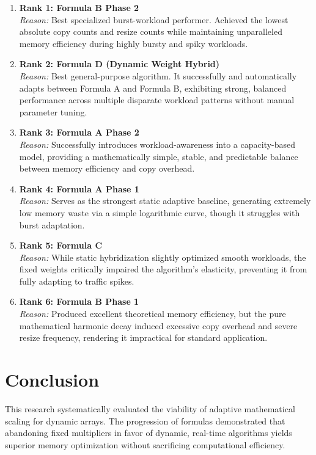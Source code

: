 \documentclass{article}
\begin{document}
\begin{enumerate}
    \item \textbf{Rank 1: Formula B Phase 2}\\
    \textit{Reason:} Best specialized burst-workload performer. Achieved the lowest absolute copy counts and resize counts while maintaining unparalleled memory efficiency during highly bursty and spiky workloads.
    
    \item \textbf{Rank 2: Formula D (Dynamic Weight Hybrid)}\\
    \textit{Reason:} Best general-purpose algorithm. It successfully and automatically adapts between Formula A and Formula B, exhibiting strong, balanced performance across multiple disparate workload patterns without manual parameter tuning.
    
    \item \textbf{Rank 3: Formula A Phase 2}\\
    \textit{Reason:} Successfully introduces workload-awareness into a capacity-based model, providing a mathematically simple, stable, and predictable balance between memory efficiency and copy overhead.
    
    \item \textbf{Rank 4: Formula A Phase 1}\\
    \textit{Reason:} Serves as the strongest static adaptive baseline, generating extremely low memory waste via a simple logarithmic curve, though it struggles with burst adaptation.
    
    \item \textbf{Rank 5: Formula C}\\
    \textit{Reason:} While static hybridization slightly optimized smooth workloads, the fixed weights critically impaired the algorithm's elasticity, preventing it from fully adapting to traffic spikes.
    
    \item \textbf{Rank 6: Formula B Phase 1}\\
    \textit{Reason:} Produced excellent theoretical memory efficiency, but the pure mathematical harmonic decay induced excessive copy overhead and severe resize frequency, rendering it impractical for standard application.
\end{enumerate}

\section{Conclusion}
This research systematically evaluated the viability of adaptive mathematical scaling for dynamic arrays. The progression of formulas demonstrated that abandoning fixed multipliers in favor of dynamic, real-time algorithms yields superior memory optimization without sacrificing computational efficiency. 
\end{document}

